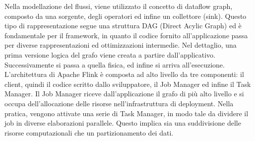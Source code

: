 


Nella modellazione del flussi, viene utilizzato il concetto di dataflow graph, composto da una sorgente, degli operatori ed infine un collettore (sink). Questo tipo di rappresentazione segue una struttura DAG (Direct Acylic Graph) ed è fondamentale per il framework, in quanto il codice fornito all'applicazione passa per diverse rappresentazioni ed ottimizzazioni intermedie. Nel dettaglio, una prima versione logica del grafo viene creata a partire dall'applicativo. Successivamente si passa a quella fisica, ed infine si arriva all'esecuzione. L'architettura di Apache Flink è composta ad alto livello da tre componenti: il client, quindi il codice scritto dallo sviluppatore, il Job Manager ed infine il Task Manager.  Il Job Manager riceve dall'applicazione il grafo di più alto livello e si occupa dell'allocazione delle risorse nell'infrastruttura di deployment. Nella pratica, vengono attivate una serie di Task Manager, in modo tale da dividere il job in diverse elaborazioni parallele. Questo implica sia una suddivisione delle risorse computazionali che un partizionamento dei dati. 

